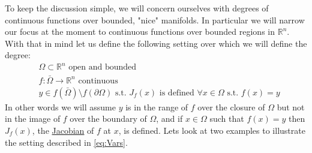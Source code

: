 \documentclass[11pt]{article}
\theoremstyle{plain}
\theoremstyle{definition}
\theoremstyle{remark}
\begin{document}
\medskip
To keep the discussion simple, %
we will concern ourselves with degrees of continuous functions over bounded, "nice" manifolds. In particular we will narrow our focus at the moment to continuous functions over bounded regions in $\mathbb{R}^n$. With that in mind let us define the following setting over which we will define the degree: 
\begin{subequations}\label{eq:Vars}
\begin{align}
& \Omega\subset\mathbb{R}^n \text{ open and bounded }\\
& f:\bar{\Omega}\rightarrow \mathbb{R}^n \text{ continuous } \\
& y\in f\left(\bar{\Omega}\right)\setminus f\left(\partial\Omega\right) \text{ s.t. $J_f(x)$ is defined $\forall x\in\Omega$ s.t. $f(x)=y$}
\end{align}
\end{subequations}
In other words we will assume $y$ is in the range of $f$ over the closure of $\Omega$ but not in the image of $f$ over the boundary of $\Omega$, and if $x\in\Omega$ such that $f(x)=y$ then $J_f(x)$, the \href{https://en.wikipedia.org/wiki/Jacobian_matrix_and_determinant}{Jacobian} of $f$ at $x$, is defined. Lets look at two examples to illustrate the setting described in \eqref{eq:Vars}. 
\end{document}
